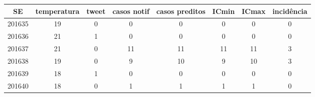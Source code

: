 \begin{tabular}{c|ccccccc}
  \hline
SE & temperatura & tweet & casos notif & casos preditos & ICmin & ICmax & incidência \\ 
  \hline
201635 & 19 & 0 & 0 & 0 & 0 & 0 & 0 \\ 
  201636 & 21 & 1 & 0 & 0 & 0 & 0 & 0 \\ 
  201637 & 21 & 0 & 11 & 11 & 11 & 11 & 3 \\ 
  201638 & 19 & 0 & 9 & 10 & 9 & 10 & 3 \\ 
  201639 & 18 & 1 & 0 & 0 & 0 & 0 & 0 \\ 
  201640 & 18 & 0 & 1 & 1 & 1 & 1 & 0 \\ 
   \hline
\end{tabular}
